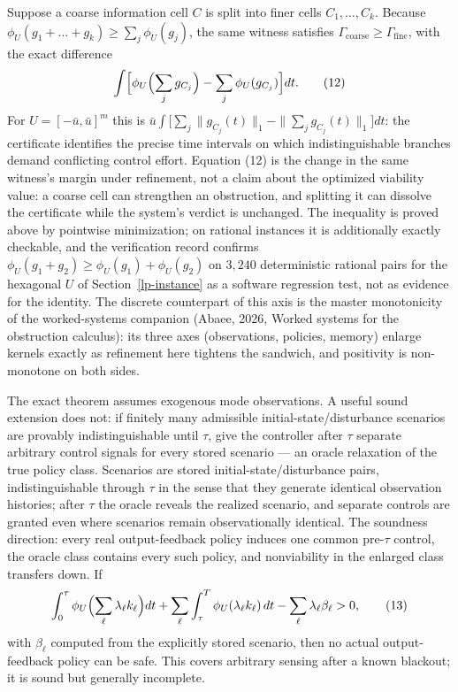 \documentclass[10pt,twocolumn]{article}
\theoremstyle{plain}
\theoremstyle{definition}
\theoremstyle{remark}
\begin{document}
Suppose a coarse information cell \(C\) is split into finer cells
\(C_1,\dots,C_k\). Because
\(\phi_U(g_1 + \dots + g_k) \ge \sum_j \phi_U(g_j)\), the same witness
satisfies \(\Gamma_{\mathrm{coarse}} \ge \Gamma_{\mathrm{fine}}\), with the
exact difference
\[
\int \Bigl[ \phi_U\Bigl(\sum_j g_{C_j}\Bigr) - \sum_j \phi_U(g_{C_j}) \Bigr]
dt.
\tag{12}
\]
For \(U = [-\bar u, \bar u]^m\) this is
\(\bar u \int \bigl[\sum_j \|g_{C_j}(t)\|_1 - \|\sum_j g_{C_j}(t)\|_1\bigr] dt\):
the certificate identifies the precise time intervals on which
indistinguishable branches demand conflicting control effort. Equation (12)
is the change in the same witness's margin under refinement, not a claim
about the optimized viability value: a coarse cell can strengthen an
obstruction, and splitting it can dissolve the certificate while the
system's verdict is unchanged. The inequality is proved above by pointwise minimization; on rational
instances it is additionally exactly checkable, and the verification record
confirms \(\phi_U(g_1 + g_2) \ge \phi_U(g_1) + \phi_U(g_2)\) on
\(3{,}240\) deterministic rational pairs for the hexagonal \(U\) of
Section~\ref{lp-instance} as a software regression test, not as evidence for
the identity. The discrete counterpart of this axis is the master
monotonicity of the worked-systems companion (Abaee, 2026, Worked systems for the obstruction calculus): its three
axes (observations, policies, memory) enlarge kernels exactly as
refinement here tightens the sandwich, and positivity is non-monotone on
both sides.

The exact theorem assumes exogenous mode observations. A useful sound
extension does not: if finitely many admissible initial-state/disturbance
scenarios are provably indistinguishable until \(\tau\), give the controller
after \(\tau\) separate arbitrary control signals for every stored scenario
--- an oracle relaxation of the true policy class. Scenarios are stored
initial-state/disturbance pairs, indistinguishable through \(\tau\) in
the sense that they generate identical observation histories; after
\(\tau\) the oracle reveals the realized scenario, and separate controls
are granted even where scenarios remain observationally identical. The
soundness direction: every real output-feedback policy induces one common
pre-\(\tau\) control, the oracle class contains every such policy, and
nonviability in the enlarged class transfers down. If
\[
\int_0^\tau \phi_U\Bigl(\sum_\ell \lambda_\ell k_\ell\Bigr) dt
+ \sum_\ell \int_\tau^T \phi_U(\lambda_\ell k_\ell)\, dt
- \sum_\ell \lambda_\ell \beta_\ell > 0,
\tag{13}
\]
with \(\beta_\ell\) computed from the explicitly stored scenario, then no
actual output-feedback policy can be safe. This covers arbitrary sensing
after a known blackout; it is sound but generally incomplete.
\end{document}
